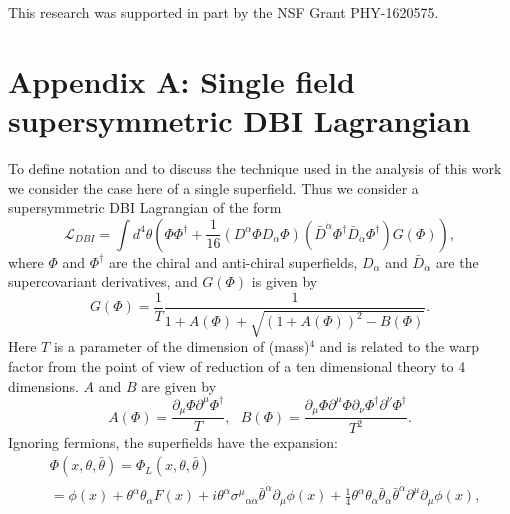 \documentclass[a4paper,11pt]{article}
\begin{document}
\acknowledgments
	This research was supported in part by the NSF Grant PHY-1620575.

\section{Appendix A: Single field supersymmetric DBI Lagrangian \label{appenA}}

	To define notation and to discuss the technique used in the analysis of this work we consider the case here of a single
	superfield. Thus we consider a supersymmetric DBI Lagrangian of the form
	\begin{equation}\label{DisplayFormulaNumbered:eq.dbiSuperLagrangian}
		\mathcal{L}_{DBI}=\int d^4\theta \left(\Phi \Phi^\dagger+\frac{1}{16}\left(D^\alpha \Phi D_\alpha \Phi \right)\left({\bar{D}}^{\dot{\alpha}}\Phi^\dagger {\bar{D}}_{\dot{\alpha}}\Phi^\dagger \right)G\left(\Phi \right)\right),
	\end{equation}
	where $\Phi$ and $\Phi^\dagger$ are the chiral and anti-chiral superfields, $D_\alpha$ and ${\bar{D}}_{\dot{\alpha}}$ are the supercovariant derivatives, and $G(\Phi)$ is given by
	\begin{equation}\label{DisplayFormulaNumbered:eq.dbiG} 
		G\left(\Phi \right)=\frac{1}{T}\frac{1}{1+A\left(\Phi \right)+\sqrt{{\left(1+A\left(\Phi \right)\right)}^2-B\left(\Phi \right)}}.
	\end{equation}
	Here $T$ is a parameter of the dimension of (mass)$^4$ and is related to the warp factor from the point of view of reduction of a ten dimensional theory to 4 dimensions. $A$ and $B$ are given by
	\begin{equation}\label{DisplayFormulaNumbered:eq.dbiA}
		A\left(\Phi \right)=\frac{\partial_\mu \Phi \partial^\mu \Phi^\dagger}{T},
		~~~B\left(\Phi \right)=\frac{\partial_\mu \Phi \partial^\mu \Phi \partial_\nu \Phi^\dagger \partial^\nu \Phi^\dagger}{T^2}.
	\end{equation}
	Ignoring fermions, the superfields have the expansion:
	\begin{equation}
	\begin{split}
		& \Phi \left(x,\theta,\bar{\theta}\right)=\Phi_L\left(x,\theta,\bar{\theta}\right) \\
		& =\phi \left(x\right)+\theta^\alpha \theta_\alpha F\left(x\right)+i \theta^\alpha {\sigma^\mu}_{\alpha \dot{\alpha}}{\bar{\theta}}^{\dot{\alpha}}\partial_\mu \phi \left(x\right)+\frac{1}{4}\theta^\alpha \theta_\alpha {\bar{\theta}}_{\dot{\alpha}}{\bar{\theta}}^{\dot{\alpha}}\partial^\mu \partial_\mu \phi \left(x\right),
	\end{split}
	\end{equation}
\end{document}
